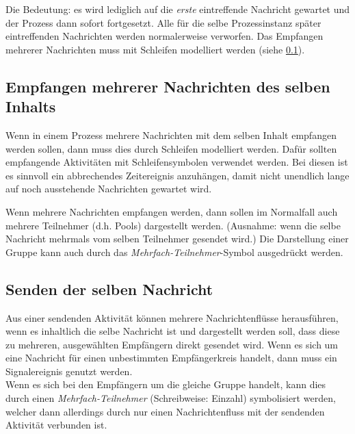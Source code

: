 \documentclass[12pt,report]{snetTeaching}
\begin{document}
Die Bedeutung: es wird lediglich auf die \emph{erste} eintreffende Nachricht gewartet und der Prozess dann sofort fortgesetzt. Alle für die selbe Prozessinstanz später eintreffenden Nachrichten werden normalerweise verworfen.
Das Empfangen mehrerer Nachrichten muss mit Schleifen modelliert werden (siehe \ref{konv:multipleReceive}).

\begin{Rahmen}
	\hfill
\end{Rahmen}





\subsection{Empfangen mehrerer Nachrichten des selben Inhalts}
\label{konv:multipleReceive}

Wenn in einem Prozess mehrere Nachrichten mit dem selben Inhalt empfangen werden sollen, dann muss dies durch Schleifen modelliert werden.
Dafür sollten empfangende Aktivitäten mit Schleifensymbolen verwendet werden. 
Bei diesen ist es sinnvoll ein abbrechendes Zeitereignis anzuhängen, damit nicht unendlich lange auf noch ausstehende Nachrichten gewartet wird.

Wenn mehrere Nachrichten empfangen werden, dann sollen im Normalfall auch mehrere Teilnehmer (d.h. Pools) dargestellt werden. (Ausnahme: wenn die selbe Nachricht mehrmals vom selben Teilnehmer gesendet wird.)
Die Darstellung einer Gruppe kann auch durch das \emph{Mehrfach-Teilnehmer}-Symbol ausgedrückt werden.


\begin{Rahmen}
	\hfill
\end{Rahmen}



\subsection{Senden der selben Nachricht}

Aus einer sendenden Aktivität können mehrere Nachrichtenflüsse herausführen, wenn es inhaltlich die selbe Nachricht ist und dargestellt werden soll, dass diese zu mehreren, ausgewählten Empfängern direkt gesendet wird. 
Wenn es sich um eine Nachricht für einen unbestimmten Empfängerkreis handelt, dann muss ein Signalereignis genutzt werden.\\
Wenn es sich bei den Empfängern um die gleiche Gruppe handelt, kann dies durch einen \emph{Mehrfach-Teilnehmer} (Schreibweise: Einzahl) symbolisiert werden, welcher dann allerdings durch nur einen Nachrichtenfluss mit der sendenden Aktivität verbunden ist.
\end{document}
